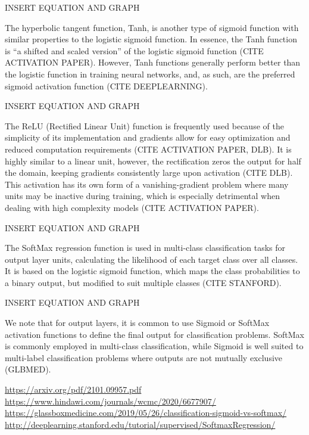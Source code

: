 \documentclass{article}
\begin{document}
INSERT EQUATION AND GRAPH

The hyperbolic tangent function, Tanh, is another type of sigmoid function with similar properties to the logistic sigmoid function. In essence, the Tanh function is “a shifted and scaled version” of the logistic sigmoid function (CITE ACTIVATION PAPER). However, Tanh functions generally perform better than the logistic function in training neural networks, and, as such, are the preferred sigmoid activation function (CITE DEEPLEARNING).  

INSERT EQUATION AND GRAPH

The ReLU (Rectified Linear Unit) function is frequently used because of the simplicity of its implementation and gradients allow for easy optimization and reduced computation requirements (CITE ACTIVATION PAPER, DLB). It is highly similar to a linear unit, however, the rectification zeros the output for half the domain, keeping gradients consistently large upon activation (CITE DLB). This activation has its own form of a vanishing-gradient problem where many units may be inactive during training, which is especially detrimental when dealing with high complexity models (CITE ACTIVATION PAPER). 

INSERT EQUATION AND GRAPH

The SoftMax regression function is used in multi-class classification tasks for output layer units, calculating the likelihood of each target class over all classes.  It is based on the logistic sigmoid function, which maps the class probabilities to a binary output, but modified to suit multiple classes (CITE STANFORD).

INSERT EQUATION AND GRAPH

We note that for output layers, it is common to use Sigmoid or SoftMax activation functions to define the final output for classification problems. SoftMax is commonly employed in multi-class classification, while Sigmoid is well suited to multi-label classification problems where outputs are not mutually exclusive (GLBMED).

\url{https://arxiv.org/pdf/2101.09957.pdf 	}
\url{https://www.hindawi.com/journals/wcmc/2020/6677907/}
\url{https://glassboxmedicine.com/2019/05/26/classification-sigmoid-vs-softmax/ 	}
\url{http://deeplearning.stanford.edu/tutorial/supervised/SoftmaxRegression/ }
\end{document}
